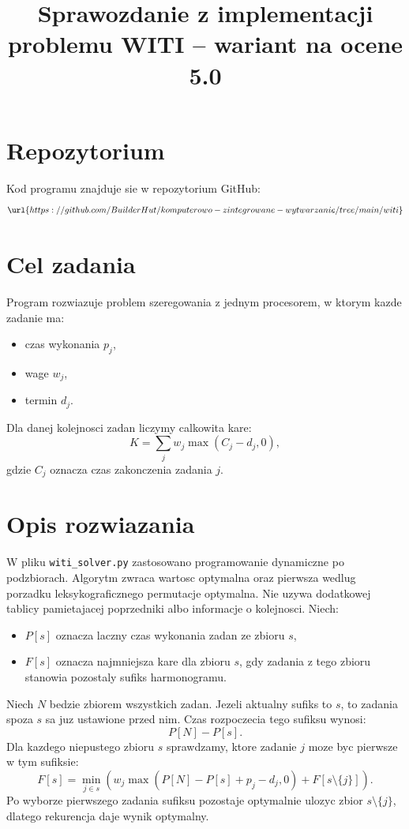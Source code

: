 \documentclass[a4paper,12pt]{article}
\title{Sprawozdanie z implementacji problemu WITI -- wariant na ocene 5.0}
\author{}
\date{}
\begin{document}
\maketitle

\section{Repozytorium}
Kod programu znajduje sie w repozytorium GitHub:
\[
\url{https://github.com/BuilderHut/komputerowo-zintegrowane-wytwarzanie/tree/main/witi}
\]

\section{Cel zadania}
Program rozwiazuje problem szeregowania z jednym procesorem, w ktorym kazde zadanie ma:
\begin{itemize}
  \item czas wykonania $p_j$,
  \item wage $w_j$,
  \item termin $d_j$.
\end{itemize}
Dla danej kolejnosci zadan liczymy calkowita kare:
\[
K = \sum_j w_j \max(C_j - d_j, 0),
\]
gdzie $C_j$ oznacza czas zakonczenia zadania $j$.

\section{Opis rozwiazania}
W pliku \texttt{witi\_solver.py} zastosowano programowanie dynamiczne po podzbiorach.
Algorytm zwraca wartosc optymalna oraz pierwsza wedlug porzadku leksykograficznego permutacje optymalna.
Nie uzywa dodatkowej tablicy pamietajacej poprzedniki albo informacje o kolejnosci.
Niech:
\begin{itemize}
  \item $P[s]$ oznacza laczny czas wykonania zadan ze zbioru $s$,
  \item $F[s]$ oznacza najmniejsza kare dla zbioru $s$, gdy zadania z tego zbioru stanowia pozostaly sufiks harmonogramu.
\end{itemize}

Niech $N$ bedzie zbiorem wszystkich zadan. Jezeli aktualny sufiks to $s$, to zadania spoza $s$ sa juz ustawione przed nim.
Czas rozpoczecia tego sufiksu wynosi:
\[
P[N] - P[s].
\]
Dla kazdego niepustego zbioru $s$ sprawdzamy, ktore zadanie $j$ moze byc pierwsze w tym sufiksie:
\[
F[s] = \min_{j \in s} \left(
  w_j \max(P[N] - P[s] + p_j - d_j, 0) + F[s \setminus \{j\}]
\right).
\]
Po wyborze pierwszego zadania sufiksu pozostaje optymalnie ulozyc zbior $s \setminus \{j\}$, dlatego rekurencja daje wynik optymalny.
\end{document}
